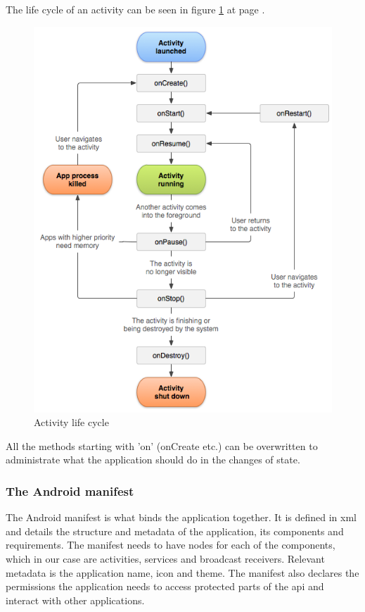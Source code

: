 The life cycle of an activity can be seen in figure \ref{fig:lifecycle} at page \pageref{fig:lifecycle}.
\begin{figure}
	\includegraphics[width=\textwidth]{activity_lifecycle}
	\caption{Activity life cycle \cite{bib:alc}}
	\label{fig:lifecycle}
\end{figure}

All the methods starting with 'on' (onCreate etc.) can be overwritten to administrate what the application should do in the changes of state.

\subsubsection{The Android manifest}
The Android manifest \cite{bib:aman} is what binds the application together. It is defined in \gls{xml} and details the structure and metadata of the application, its components and requirements. The manifest needs to have nodes for each of the components, which in our case are activities, services and broadcast receivers. Relevant metadata is the application name, icon and theme. The manifest also declares the permissions the application needs to access protected parts of the \gls{api} and interact with other applications.

